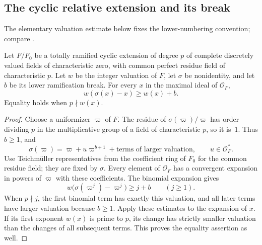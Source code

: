 \subsection{The cyclic relative extension and its break}
The elementary valuation estimate below fixes the lower-numbering convention; compare \citet[Chapter~IV, \S1]{Serre1979}.

\begin{lemma}\label{cr-lem:valuation}
Let $F/F_0$ be a totally ramified cyclic extension of degree $p$ of
complete discretely valued fields of characteristic zero, with common
perfect residue field of characteristic $p$. Let $w$ be the integer
valuation of $F$, let $\sigma$ be nonidentity, and let $b$ be its lower
ramification break. For every $x$ in the maximal ideal of $\mathcal O_F$,
\[
 w(\sigma(x)-x)\geq w(x)+b.
\]
Equality holds when $p\nmid w(x)$.
\end{lemma}

\begin{proof}
Choose a uniformizer $\varpi$ of $F$. The residue of
$\sigma(\varpi)/\varpi$ has order dividing $p$ in the multiplicative
group of a field of characteristic $p$, so it is~$1$. Thus $b\geq1$, and
\[
 \sigma(\varpi)=\varpi+u\varpi^{b+1}
                  +\text{terms of larger valuation},\qquad u\in\mathcal O_F^*.
\]
Use Teichm\"uller representatives from the coefficient ring of $F_0$ for
the common residue field; they are fixed by $\sigma$. Every element of
$\mathcal O_F$ has a convergent expansion in powers of $\varpi$ with
these coefficients. The binomial expansion gives
\[
 w\bigl(\sigma(\varpi^j)-\varpi^j\bigr)\geq j+b\qquad(j\geq1).
\]
When $p\nmid j$, the first binomial term has exactly this valuation, and
all later terms have larger valuation because $b\geq1$. Apply these
estimates to the expansion of $x$. If its first exponent $w(x)$ is prime
to $p$, its change has strictly smaller valuation than the changes of all
subsequent terms. This proves the equality assertion as well.
\end{proof}

